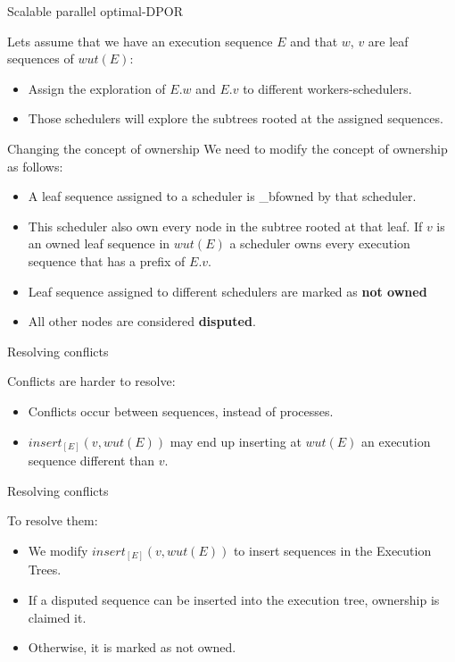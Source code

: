 \begin{frame} {Scalable parallel optimal-DPOR}


Lets assume that we have an execution sequence $E$ and that $w$, $v$ are leaf sequences of $wut(E)$:
\begin{itemize}[<+->]
\item Assign the exploration of $E.w$ and $E.v$ to different workers-schedulers.
\item Those schedulers will explore the subtrees rooted at the assigned sequences.
\end{itemize}


\end{frame}

\begin{frame} {Changing the concept of ownership}
We need to modify the concept of ownership as follows:

\begin{itemize}[<+->]
\item A leaf sequence assigned to a scheduler is \text_bf{owned} by that scheduler. 
\item This scheduler also own every node in the subtree rooted at that leaf. If $v$ is an owned leaf sequence in $wut(E)$ a scheduler owns every execution sequence that has a prefix of $E.v$.
\item Leaf sequence assigned to different schedulers are marked as \textbf{not owned}
\item All other nodes are considered \textbf{disputed}.
\end{itemize}
\end{frame}

\begin{frame} {Resolving conflicts}

Conflicts are harder to resolve:

\begin{itemize}[<+->]
\item Conflicts occur between sequences, instead of processes.
\item $insert_{[E]}(v,wut(E))$ may end up inserting at $wut(E)$ an execution sequence different than $v$.

\end{itemize}

\end{frame}

\begin{frame} {Resolving conflicts}

To resolve them:

\begin{itemize}[<+->]
\item We modify $insert_{[E]}(v,wut(E))$ to insert sequences in the Execution Trees.
\item If a disputed sequence can be inserted into the execution tree, ownership is claimed it.
\item Otherwise, it is marked as not owned.

\end{itemize}

\end{frame}


